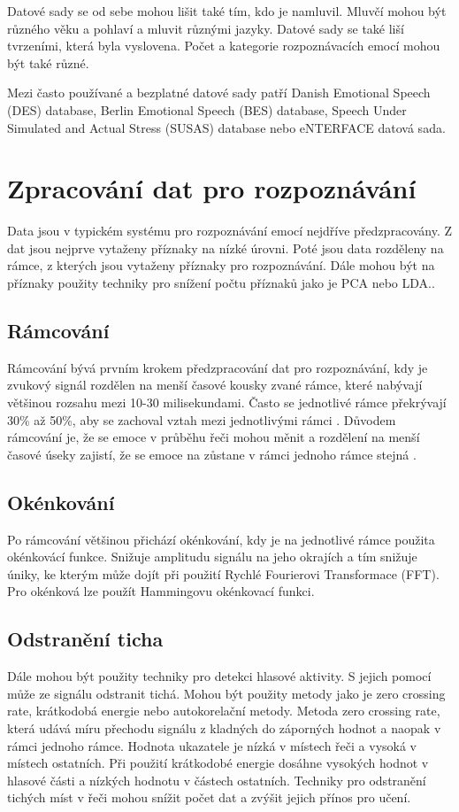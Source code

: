 \documentclass[FM,BP]{tulthesis}
\begin{document}
Datové sady se od sebe mohou lišit také tím, kdo je namluvil. Mluvčí mohou být různého věku a pohlaví a mluvit různými jazyky. Datové sady se také liší tvrzeními, která byla vyslovena. Počet a kategorie rozpoznávacích emocí mohou být také různé.\cite{DBLP:journals/speech/AkcayO20}

Mezi často používané a bezplatné datové sady patří Danish Emotional Speech (DES) database, Berlin Emotional Speech (BES) database, Speech Under Simulated and Actual Stress (SUSAS) database nebo eNTERFACE datová sada.\cite{konar_chakraborty_2015}


\section{Zpracování dat pro rozpoznávání}
Data jsou v typickém systému pro rozpoznávání emocí nejdříve předzpracovány. Z dat jsou nejprve vytaženy příznaky na nízké úrovni. Poté jsou data rozděleny na rámce, z kterých jsou vytaženy příznaky pro rozpoznávání. Dále mohou být na příznaky použity techniky pro snížení počtu příznaků jako je PCA nebo LDA.\cite{konar_chakraborty_2015}.

\subsection{Rámcování}
Rámcování bývá prvním krokem předzpracování dat pro rozpoznávání, kdy je zvukový signál rozdělen na menší časové kousky zvané rámce, které nabývají většinou rozsahu mezi 10-30 milisekundami. Často se jednotlivé rámce překrývají 30\% až 50\%, aby se zachoval vztah mezi jednotlivými rámci \cite{DBLP:journals/speech/AkcayO20}. Důvodem rámcování je, že se emoce v průběhu řeči mohou měnit a rozdělení na menší časové úseky zajistí, že se emoce na zůstane v rámci jednoho rámce stejná \cite{konar_chakraborty_2015}.

\subsection{Okénkování}
Po rámcování většinou přichází okénkování, kdy je na jednotlivé rámce použita okénkovácí funkce. Snižuje amplitudu signálu na jeho okrajích a tím snižuje úniky, ke kterým může dojít při použití Rychlé Fourierovi Transformace (FFT). Pro okénková lze použít Hammingovu okénkovací funkci\cite{DBLP:journals/speech/AkcayO20}.

\subsection{Odstranění ticha}
Dále mohou být použity techniky pro detekci hlasové aktivity. S jejich pomocí může ze signálu odstranit tichá. Mohou být použity metody jako je zero crossing rate, krátkodobá energie nebo autokorelační metody. Metoda zero crossing rate, která udává míru přechodu signálu z kladných do záporných hodnot a naopak v rámci jednoho rámce. Hodnota ukazatele je nízká v místech řeči a vysoká v místech ostatních. Při použití krátkodobé energie dosáhne vysokých hodnot v hlasové části a nízkých hodnotu v částech ostatních. Techniky pro odstranění tichých míst v řeči mohou snížit počet dat a zvýšit jejich přínos pro učení\cite{DBLP:journals/speech/AkcayO20}.
\end{document}
